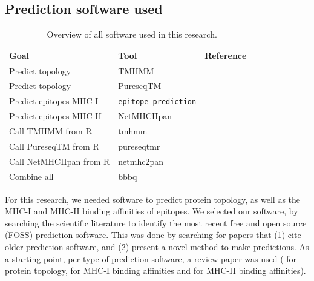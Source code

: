 \subsection{Prediction software used}
\label{subsec:prediction_software_used}

\begin{table}[]
  \begin{tabular}{llll}
    Goal & Tool & Reference \\ 
    \hline
    Predict topology                  & TMHMM                     & \cite{krogh2001predicting} \\
    Predict topology                  & PureseqTM                 & \cite{wang2019efficient} \\
    Predict epitopes MHC-I            & \verb;epitope-prediction; & \cite{bianchi2017} \\
    Predict epitopes MHC-II           & NetMHCIIpan               & \cite{nielsen2008quantitative,karosiene2013netmhciipan} \\
    Call TMHMM from R                 & tmhmm                     & \cite{tmhmm} \\
    Call PureseqTM from R             & pureseqtmr                & \cite{pureseqtmr} \\
    Call NetMHCIIpan from R           & netmhc2pan                & \cite{netmhc2pan} \\
    Combine all                       & bbbq                      & \cite{bbbq}
  \end{tabular}
  \caption{
    Overview of all software used in this research.
  }
  \label{table:software_used}
\end{table}


For this research, we needed software to predict protein
topology, as well as the MHC-I and MHC-II binding affinities
of epitopes. We selected our software, by
searching the scientific literature 
to identify the most recent free and open source (FOSS) 
prediction software.
This was done by searching for papers that (1) cite older
prediction software, and (2) present a novel method to make predictions.
As a starting point, per type of prediction software,
a review paper was used (\cite{moller2001evaluation} for protein
topology, \cite{lundegaard2011prediction} for MHC-I
binding affinities and \cite{nielsen2003reliable} for MHC-II binding
affinities). 

